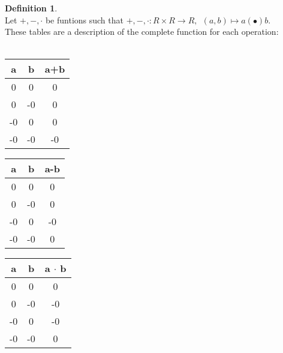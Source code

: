 \documentclass[12pt]{report}
\theoremstyle{definition}
\newtheorem{definition}{Definition}[section]
\theoremstyle{remark}
\begin{document}
    \begin{definition}$\ $\\
    Let $+, -, \cdot $ be funtions such that $+, -, \cdot : R \times R \rightarrow R,\ \ (a,b) \mapsto a(\bullet)b$. \\ These tables are a description of the complete function for each operation: \\\\
      \begin{minipage}{0.25\textwidth}
        \begin{center}
          \begin{tabular}{| c | c || c |} \hline
            a & b & a+b \\ \hline
            0 & 0 & 0 \\ \hline
            0 & -0 & 0 \\ \hline
            -0 & 0 & 0 \\ \hline
            -0 & -0 & -0 \\ \hline
          \end{tabular}
        \end{center}
      \end{minipage}
      \begin{minipage}{0.25\textwidth}
        \begin{center}
          \begin{tabular}{| c | c || c |} \hline
            a & b & a-b \\ \hline
            0 & 0 & 0 \\ \hline
            0 & -0 & 0 \\ \hline
            -0 & 0 & -0 \\ \hline
            -0 & -0 & 0 \\ \hline
          \end{tabular}
        \end{center}
      \end{minipage}
      \begin{minipage}{0.25\textwidth}
        \begin{center}
          \begin{tabular}{| c | c || c |} \hline
            a & b & a $\cdot$ b \\ \hline
            0 & 0 & 0 \\ \hline
            0 & -0 & -0 \\ \hline
            -0 & 0 & -0 \\ \hline
            -0 & -0 & 0 \\ \hline
          \end{tabular}
        \end{center}
      \end{minipage}
    \end{definition}
\end{document}
